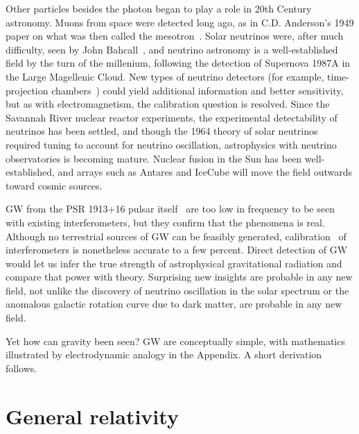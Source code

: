 Other particles besides the photon began to play a role in 20th Century astronomy.
Muons from space were detected long ago, as in C.D. Anderson's 1949 paper on what was then called the mesotron~\cite{CDAnderson}. 
Solar neutrinos were, after much difficulty, seen by John Bahcall~\cite{NeutrinoReview}, and neutrino astronomy is a well-established field by the turn of the millenium, following the detection of Supernova 1987A in the Large Magellenic Cloud. 
New types of neutrino detectors (for example, time-projection chambers~\cite{EBubble2005,MeadorsNevis2006}) could yield additional information and better sensitivity, but as with electromagnetism, the calibration question is resolved. 
Since the Savannah River nuclear reactor experiments, the experimental detectability of neutrinos has been settled, and though the 1964 theory of solar neutrinos~\cite{NeutrinosSolarTheoretical} required tuning to account for neutrino oscillation, astrophysics with neutrino observatories is becoming mature.
Nuclear fusion in the Sun has been well-established, and arrays such as Antares and IceCube will move the field outwards toward cosmic sources.


 GW from the PSR 1913+16 pulsar itself~\cite{WeisbergTaylor2004} are too low in frequency to be seen with existing interferometers, but they confirm that the phenomena is real.
Although no terrestrial sources of GW can be feasibly generated, calibration~\cite{AbadieCalibration2010} of interferometers is nonetheless accurate to a few percent.
Direct detection of GW would let us infer the true strength of astrophysical gravitational radiation and compare that power with theory. 
Surprising new insights are probable in any new field, not unlike the discovery of neutrino oscillation in the solar spectrum or the anomalous galactic rotation curve due to dark matter, are probable in any new field.

Yet how can gravity been seen?
GW are conceptually simple, with mathematics illustrated by electrodynamic analogy in the Appendix.
A short derivation follows.




    \section{General relativity}
    \label{general_relativity}

